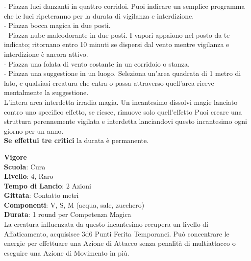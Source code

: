 \begin{multicols}{2}
- Piazza luci danzanti in quattro corridoi. Puoi indicare un semplice programma che le luci ripeteranno per la durata di vigilanza e interdizione.\\
- Piazza bocca magica in due posti.\\
- Piazza nube maleodorante in due posti. I vapori appaiono nel posto da te indicato; ritornano entro 10 minuti se dispersi dal vento mentre vigilanza e interdizione è ancora attivo.\\
- Piazza una folata di vento costante in un corridoio o stanza.\\
- Piazza una suggestione in un luogo. Seleziona un'area quadrata di 1 metro di lato, e qualsiasi creatura che entra o passa attraverso quell'area riceve mentalmente la suggestione.\\

L'intera area interdetta irradia magia. Un incantesimo dissolvi magie lanciato contro uno specifico effetto, se riesce, rimuove solo quell'effetto Puoi creare una struttura perennemente vigilata e interdetta lanciandovi questo incantesimo ogni giorno per un anno.\\
\textbf{Se effettui tre critici} la durata è permanente.

\medskip\textbf{Vigore}\\
\textbf{Scuola}: Cura\\
\textbf{Livello}: 4, Raro\\
\textbf{Tempo di Lancio}: 2 Azioni\\
\textbf{Gittata}: Contatto metri\\
\textbf{Componenti}: V, S, M (acqua, sale, zucchero)\\
\textbf{Durata}: 1 round per Competenza Magica\\
La creatura influenzata da questo incantesimo recupera un livello di Affaticamento, acquisisce 3d6 Punti Ferita Temporanei. Può concentrare le energie per effettuare una Azione di Attacco senza penalità di multiattacco o eseguire una Azione di Movimento in più.



\end{multicols}
